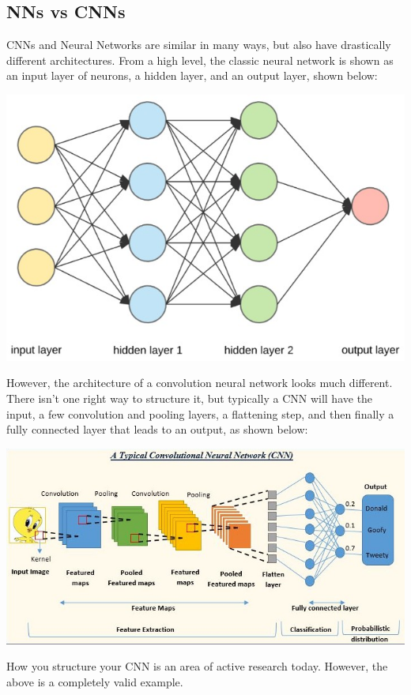 \documentclass{article}
\begin{document}
    \subsection{NNs vs CNNs}
        CNNs and Neural Networks are similar in many ways, but also have drastically different architectures. From a high level, the classic neural network is shown as an input layer of neurons, a hidden layer, and an output layer, shown below:
        \begin{center}
            \includegraphics[scale=0.6]{images/NN.jpg}    
        \end{center}

        However, the architecture of a convolution neural network looks much different. There isn't one right way to structure it, but typically a CNN will have the input, a few convolution and pooling layers, a flattening step, and then finally a fully connected layer that leads to an output, as shown below:
        \begin{center}
            \includegraphics[scale=0.6]{images/CNN.jpg}
        \end{center}
        How you structure your CNN is an area of active research today. However, the above is a completely valid example.
\end{document}
